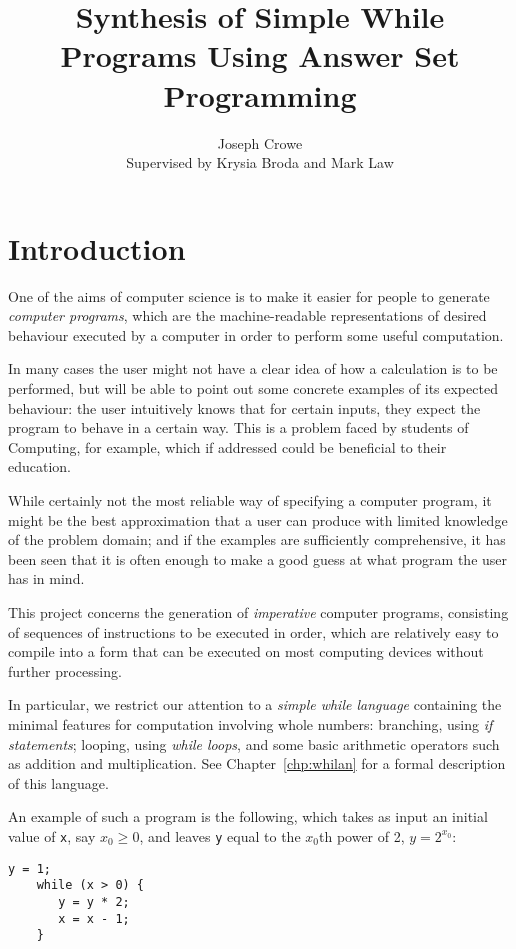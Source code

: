\documentclass[a4paper,twoside,notitlepage]{report}
\begin{document}
\title{Synthesis of Simple While Programs Using Answer Set Programming}
\author{Joseph Crowe \\ Supervised by Krysia Broda and Mark Law}
\maketitle
\clearpage

\tableofcontents

\chapter{Introduction} \label{chp:intro}

One of the aims of computer science is to make it easier for people to 
generate \emph{computer programs}, which are the machine-readable 
representations of desired behaviour executed by a computer in order to 
perform some useful computation.

In many cases the user might not have a clear idea of how a calculation is 
to be performed, but will be able to point out some concrete examples of 
its expected behaviour: the user intuitively knows that for certain 
inputs, they expect the program to behave in a certain way. This is a 
problem faced by students of Computing, for example, which if addressed 
could be beneficial to their education.

While certainly not the most reliable way of specifying a computer 
program, it might be the best approximation that a user can produce with 
limited knowledge of the problem domain; and if the examples are 
sufficiently comprehensive, it has been seen that it is often enough to 
make a good guess at what program the user has in mind.

This project concerns the generation of \emph{imperative} computer 
programs, consisting of sequences of instructions to be executed in order, 
which are relatively easy to compile into a form that can be executed on 
most computing devices without further processing.

In particular, we restrict our attention to a \emph{simple while language} 
containing the minimal features for computation involving whole numbers: 
branching, using \emph{if statements}; looping, using \emph{while loops}, 
and some basic arithmetic operators such as addition and multiplication.
See Chapter~\ref{chp:whilan} for a formal description of this language.

An example of such a program is the following, which takes as input an initial 
value of \texttt{x}, say $x_0 \ge 0$, and leaves \texttt{y} equal to the 
$x_0$th power of 2, $y = 2^{x_0}$:
\begin{Verbatim}[samepage=true]
    y = 1;
    while (x > 0) {
       y = y * 2;
       x = x - 1;
    }
\end{Verbatim}
\end{document}
